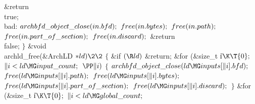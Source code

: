 \&{return} \\{true};\6
\4\\{bad}:\5
${}\\{archbfd\_object\_close}(\\{in}.\\{bfd});{}$\6
${}\\{free}(\\{in}.\\{bytes});{}$\6
${}\\{free}(\\{in}.\\{path});{}$\6
${}\\{free}(\\{in}.\\{part\_of\_section});{}$\6
${}\\{free}(\\{in}.\\{discard});{}$\6
\&{return} \\{false}; $\}$ \1\1\&{void} \\{archld\_free}(\&{ArchLD} ${}{*}%
\\{ld})\2\2{}$\6
${}\{{}$\1\6
\&{if} ${}(\R\\{ld}){}$\1\5
\&{return};\2\6
\&{for} (\&{size\_t} \|i${}\K\T{0};{}$ ${}\|i<\\{ld}\MG\\{input\_count};{}$ ${}%
\PP\|i){}$\5
${}\{{}$\1\6
${}\\{archbfd\_object\_close}(\\{ld}\MG\\{inputs}[\|i].\\{bfd});{}$\6
${}\\{free}(\\{ld}\MG\\{inputs}[\|i].\\{path});{}$\6
${}\\{free}(\\{ld}\MG\\{inputs}[\|i].\\{bytes});{}$\6
${}\\{free}(\\{ld}\MG\\{inputs}[\|i].\\{part\_of\_section});{}$\6
${}\\{free}(\\{ld}\MG\\{inputs}[\|i].\\{discard});{}$\6
\4${}\}{}$\2\6
\&{for} (\&{size\_t} \|i${}\K\T{0};{}$ ${}\|i<\\{ld}\MG\\{global\_count};{}$
